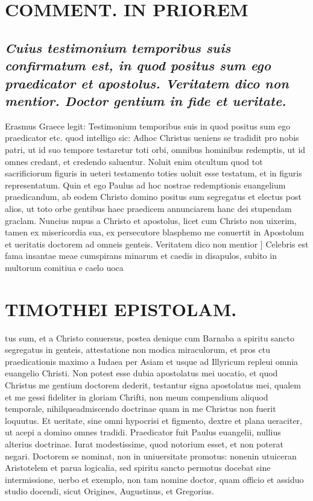 \documentclass{article}
\begin{document}
\begin{pages}
\section*{COMMENT. IN PRIOREM }
\marginpar{[ p.52 ]}
\marginpar{[ p.tus ]}
{}
\subsection*{\textit{Cuius testimonium temporibus suis confirmatum est, in quod positus sum ego praedicator et apostolus. Veritatem dico non mentior. Doctor gentium in fide et ueritate. }}\pstart Erasmus Graece legit: Testimonium temporibus suis in quod positus sum ego praedicator etc. quod intelligo sic: Adhoc Christus ueniens se tradidit pro nobis patri, ut id suo tempore testaretur toti orbi, omnibus hominibus redemptis, ut id omnes credant, et credendo saluentur. Noluit enim otcultum quod tot sacrificiorum figuris in ueteri testamento toties uoluit esse testatum, et in figuris representatum. Quin et ego Paulus ad hoc nostrae redemptionis euangelium praedicandum, ab eodem Christo domino positus sum segregatus et electus post alios, ut toto orbe gentibus haec praedicem annunciarem hanc dei stupendam graclam. Nuncius nupus a Christo et apostolus, licet cum Christo non uixerim, tamen ex misericordia sua, ex persecutore blasphemo me conuertit in Apostolum et ueritatis doctorem ad omneis genteis.  \pend\pstart Veritatem dico non mentior ] Celebris est fama insantae meae cumspirans minarum et caedis in disapulos, subito in multorum comitiua e caelo uoca\pend
\section*{TIMOTHEI EPISTOLAM. }
\marginpar{[ p.53 ]}\pstart tus sum, et a Christo conuersus, postea denique  cum Barnaba a spiritu sancto segregatus in genteis, attestatione non modica miraculorum, et pros ctu praedicationis maximo a Iudaea per Asiam et usque  ad Illyricum repleui omnia euangelio Christi. Non potest esse dubia apostolatus mei uocatio, et quod Christus me gentium doctorem dederit, testantur signa apostolatus mei, qualem et me gessi fideliter in gloriam Chrifti, non meum compendium aliquod temporale, nihilqueadmiscendo doctrinae quam in me Christus non fuerit loquutus. Et ueritate, sine omni hypocrisi et figmento, dextre et plana ueraciter, ut acepi a domino omnes tradidi.  \pend\pstart Praedicator fuit Paulus euangelii, nullius alterius doctrinae. Iurat modestissime, quod notorium esset, et non poterat negari. Doctorem se nominat, non in uniuersitate promotus: nonenin utuiceran Aristotelem et parua logicalia, sed spiritu sancto permotus docebat sine intermissione, uerbo et exemplo, non tam nomine doctor, quam officio et assiduo studio docendi, sicut Origines, Augustinus, et Gregorius.  \pend
{}
{}

\end{pages}
\end{document}
